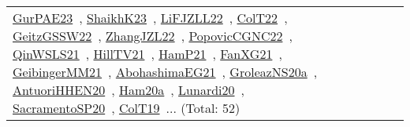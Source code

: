 {\begin{longtable}{lp{3cm}>{\raggedright\arraybackslash}p{6cm}>{\raggedright\arraybackslash}p{6cm}>{\raggedright\arraybackslash}p{8cm}}
\href{../works/GurPAE23.pdf}{GurPAE23}~\cite{GurPAE23}, \href{../works/ShaikhK23.pdf}{ShaikhK23}~\cite{ShaikhK23}, \href{../works/LiFJZLL22.pdf}{LiFJZLL22}~\cite{LiFJZLL22}, \href{../works/ColT22.pdf}{ColT22}~\cite{ColT22}, \href{../works/GeitzGSSW22.pdf}{GeitzGSSW22}~\cite{GeitzGSSW22}, \href{../works/ZhangJZL22.pdf}{ZhangJZL22}~\cite{ZhangJZL22}, \href{../works/PopovicCGNC22.pdf}{PopovicCGNC22}~\cite{PopovicCGNC22}, \href{../works/QinWSLS21.pdf}{QinWSLS21}~\cite{QinWSLS21}, \href{../works/HillTV21.pdf}{HillTV21}~\cite{HillTV21}, \href{../works/HamP21.pdf}{HamP21}~\cite{HamP21}, \href{../works/FanXG21.pdf}{FanXG21}~\cite{FanXG21}, \href{../works/GeibingerMM21.pdf}{GeibingerMM21}~\cite{GeibingerMM21}, \href{../works/AbohashimaEG21.pdf}{AbohashimaEG21}~\cite{AbohashimaEG21}, \href{../works/GroleazNS20a.pdf}{GroleazNS20a}~\cite{GroleazNS20a}, \href{../works/AntuoriHHEN20.pdf}{AntuoriHHEN20}~\cite{AntuoriHHEN20}, \href{../works/Ham20a.pdf}{Ham20a}~\cite{Ham20a}, \href{../works/Lunardi20.pdf}{Lunardi20}~\cite{Lunardi20}, \href{../works/SacramentoSP20.pdf}{SacramentoSP20}~\cite{SacramentoSP20}, \href{../works/ColT19.pdf}{ColT19}~\cite{ColT19}... (Total: 52)\\

\end{longtable}}
